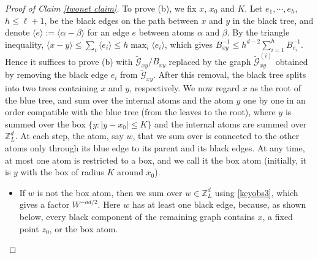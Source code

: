 \documentclass{article}
\newcommand{\1}{\mathds{1}}
\numberwithin{equation}{section}
\newcommand{\al}{\alpha}
\renewcommand{\cal}{\mathcal}
\newcommand{\wt}{\widetilde}
\renewcommand{\leq}{\leqslant}
\renewcommand{\le}{\leq}
\newcommand{\Z}{\mathbb{Z}}
\theoremstyle{plain} %
\theoremstyle{remark}
\begin{document}
\begin{proof}[Proof of Claim \ref{twonet claim}]
To prove (b), we fix $x$, $x_0$ and $K$. Let $e_1,\cdots,e_h$, $h\le \ell+1$, be the black edges on the path between $x$ and $y$ in the black tree, and denote $\langle e\rangle:=\langle \al-\beta\rangle$ for an edge $e$ between atoms $\al$ and $\beta$. By the triangle inequality, $\langle x-y\rangle \le \sum_{i}\langle e_i\rangle\le h\max_i\langle e_i\rangle$, which gives $B_{xy}^{-1}\le h^{d-2}\sum_{i=1}^h B_{e_i}^{-1}$. Hence it suffices to prove (b) with $\wt{\cal G}_{xy}/B_{xy}$ replaced by the graph $\wt{\cal G}^{(i)}_{xy}$ obtained by removing the black edge $e_i$ from $\wt{\cal G}_{xy}$. After this removal, the black tree splits into two trees containing $x$ and $y$, respectively. We now regard $x$ as the root of the blue tree, and sum over the internal atoms and the atom $y$ one by one in an order compatible with the blue tree (from the leaves to the root), where $y$ is summed over the box $\{y:|y-x_0|\le K\}$ and the internal atoms are summed over $\Z_L^d$. At each step, the atom, say $w$, that we sum over is connected to the other atoms only through its blue edge to its parent and its black edges. At any time, at most one atom is restricted to a box, and we call it the box atom (initially, it is $y$ with the box of radius $K$ around $x_0$). 
\begin{itemize}
\item If $w$ is not the box atom, then we sum over $w\in\Z_L^d$ using \eqref{keyobs3}, which gives a factor $W^{-ad/2}$. Here $w$ has at least one black edge, because, as shown below, every black component of the remaining graph contains $x$, a fixed point $z_0$, or the box atom.


\end{itemize}
\end{proof}
\end{document}
